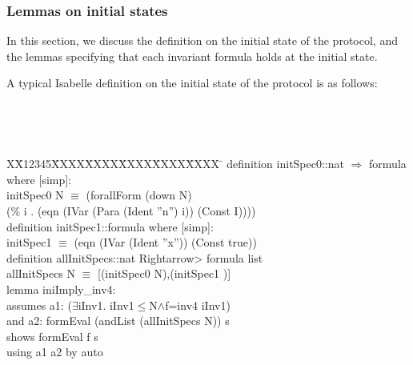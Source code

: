 \documentclass[final]{IEEEtran}
\newlength{\fminilength}
\newenvironment{fmini}[1][\linewidth]
  {\setlength{\fminilength}{#1\fboxsep-2\fboxrule}%
   \vspace{2ex}\noindent\begin{lrbox}{\fminibox}\begin{minipage}{\fminilength}%
   \mbox{ }\hfill\vspace{-2.5ex}}%
  {\end{minipage}\end{lrbox}\vspace{1ex}\hspace{0ex}%
   \framebox{\usebox{\fminibox}}}
\newenvironment{specification}
{\noindent\scriptsize
\tt\begin{fmini}\begin{tabbing}X\=X12345\=XXXX\=XXXX\=XXXX\=XXXX\=XXXX
\=\+\kill} {\end{tabbing}\normalfont\end{fmini}}
\def \twoSpaces {\ \ }
\def \iInv {iInv}
\begin{document}
\subsubsection{Lemmas on initial states}

In this section, we discuss the definition on the initial state of the protocol, and the lemmas specifying that each invariant formula holds at the initial state.

A typical Isabelle definition on the initial state of the protocol is as follows:

\begin{specification}
definition initSpec0::nat $\Rightarrow$ formula where [simp]:\\
initSpec0 N $\equiv$ (forallForm (down N) \\
(\% i . (eqn (IVar (Para (Ident ''n'') i)) (Const I))))\\

definition initSpec1::formula where [simp]:\\
initSpec1  $\equiv$ (eqn (IVar (Ident ''x'')) (Const true))\\

definition allInitSpecs::nat \<Rightarrow> formula list\\
allInitSpecs N $\equiv$ [(initSpec0 N),(initSpec1 )]\\

lemma iniImply\_inv4:\\
assumes a1: ($\exists$\iInv1. \iInv1$\le$N$\wedge$f=inv4 \iInv1)\\
and a2: formEval (andList (allInitSpecs N)) s\\
shows formEval f s\\
 using a1 a2 by auto\\
\end{specification}
\end{document}
